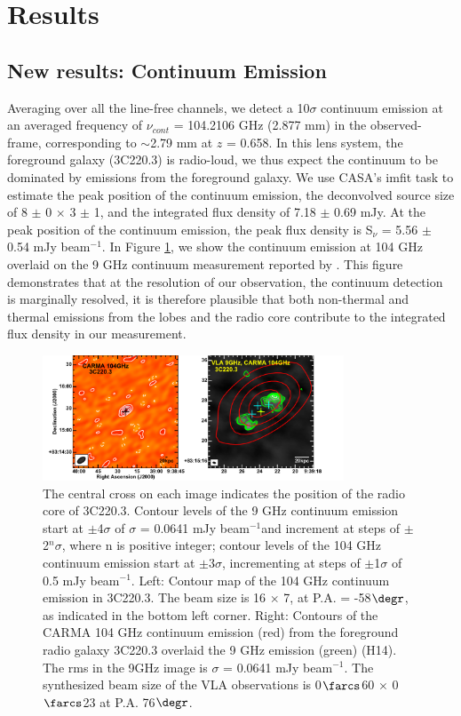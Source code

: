 \documentclass[twocolumn,apj,numberedappendix]{emulateapj}
\newcommand{\pmOne}{$^{-1}$}
\begin{document}
\section{Results}\label{sec:res}
\subsection{New results: Continuum Emission} 
Averaging over all the line-free channels, we detect a 10$\sigma$ continuum emission at an averaged frequency of $\nu_{cont}$ = 104.2106 GHz (2.877 mm) in the observed-frame, corresponding to $\sim$2.79 mm at $z$ = 0.658. In this lens system, the 
foreground galaxy (3C220.3) is radio-loud, we thus expect the continuum to be dominated by emissions from the foreground galaxy. We use CASA's {\sc imfit} task to estimate the peak position of the continuum emission, the deconvolved source size of 8 $\pm$ 0 $\times$ 3 $\pm$ 1, and the integrated flux density of 7.18 $\pm$ 0.69 mJy. At the peak position of the continuum emission, the peak flux density is S$_\nu$ = 5.56 $\pm$ 0.54 
mJy beam\pmOne.
In Figure \ref{fig:cont}, we show the continuum emission at 104 GHz overlaid on the 9 GHz continuum measurement reported by \citet{Haas14}. This figure demonstrates that at the resolution of our observation, the continuum detection is marginally resolved, it is therefore plausible that both non-thermal and thermal emissions from the lobes and the radio core contribute to the integrated flux density in our measurement.

\begin{figure}[tbph]
\centering
\includegraphics[width=0.80\textwidth]{Figure/ContPanel}
\caption{The central cross on each image indicates the position of the radio core of 3C220.3. Contour levels of the 9 GHz continuum 
emission start at $\pm$4$\sigma$ of $\sigma$ = 0.0641 mJy beam\pmOne and increment at steps of $\pm$2$^n\sigma$, 
where n is positive integer; contour levels of the 104 GHz continuum emission start at $\pm$3$\sigma$, incrementing at steps 
of $\pm$1$\sigma$ of 0.5 mJy beam\pmOne.
Left: Contour map of the 104 GHz continuum emission in 3C220.3. The beam size is 16 $\times$ 7, at P.A. = 
-58$\degr$, as indicated in the bottom left corner. Right: Contours of the CARMA 104 GHz continuum emission (red) from the 
foreground radio galaxy 3C220.3 overlaid the 9 GHz emission (green) (H14). The rms in the 9GHz image is $\sigma$ 
= 0.0641 mJy beam\pmOne. The synthesized beam size of the VLA observations is 0$\farcs$60 $\times$ 0$\farcs$23 at P.A. 
76$\degr$. 
\label{fig:cont}}
\end{figure}
\end{document}
